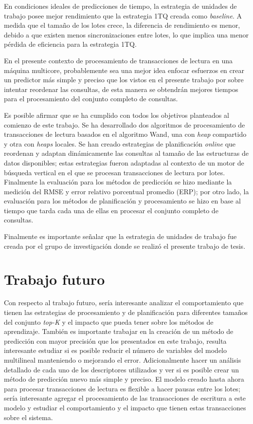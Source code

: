En condiciones ideales de predicciones de tiempo, la estrategia de unidades de trabajo posee mejor rendimiento que la estrategia 1TQ creada como \textit{baseline}. A medida que el tamaño de los lotes crece, la diferencia de rendimiento es menor, debido a que existen menos sincronizaciones entre lotes, lo que implica una menor pérdida de eficiencia para la estrategia 1TQ.

En el presente contexto de procesamiento de transacciones de lectura en una máquina multicore, probablemente sea una mejor idea enfocar esfuerzos en crear un predictor más simple y preciso que los vistos en el presente trabajo por sobre intentar reordenar las consultas, de esta manera se obtendrán mejores tiempos para el procesamiento del conjunto completo de consultas.

Es posible afirmar que se ha cumplido con todos los objetivos planteados al comienzo de este trabajo. Se ha desarrollado dos algoritmos de procesamiento de transacciones de lectura basados en el algoritmo Wand, una con \textit{heap} compartido y otra con \textit{heaps} locales. Se han creado estrategias de planificación \textit{online} que reordenan y adaptan dinámicamente las consultas al tamaño de las estructuras de datos disponibles; estas estrategias fueron adaptadas al contexto de un motor de búsqueda vertical en el que se procesan transacciones de lectura por lotes. Finalmente la evaluación para los métodos de predicción se hizo mediante la medición del RMSE y error relativo porcentual promedio (ERP); por otro lado, la evaluación para los métodos de planificación y procesamiento se hizo en base al tiempo que tarda cada una de ellas en procesar el conjunto completo de consultas.

Finalmente es importante señalar que la estrategia de unidades de trabajo fue creada por el grupo de investigación donde se realizó el presente trabajo de tesis.

\section{Trabajo futuro}
\label{conclu:trabajofuturo}
Con respecto al trabajo futuro, sería interesante analizar el comportamiento que tienen las estrategias de procesamiento y de planificación para diferentes tamaños del conjunto \textit{top-K} y el impacto que pueda tener sobre los métodos de aprendizaje.
También es importante trabajar en la creación de un método de predicción con mayor precisión que los presentados en este trabajo, resulta interesante estudiar si es posible reducir el número de variables del modelo multilineal manteniendo o mejorando el error. Adicionalmente hacer un análisis detallado de cada uno de los descriptores utilizados y ver si es posible crear un método de predicción nuevo más simple y preciso.
El modelo creado hasta ahora para procesar transacciones de lectura es flexible a hacer pausas entre los lotes; sería interesante agregar el procesamiento de las transacciones de escritura a este modelo y estudiar el comportamiento y el impacto que tienen estas transacciones sobre el sistema.
